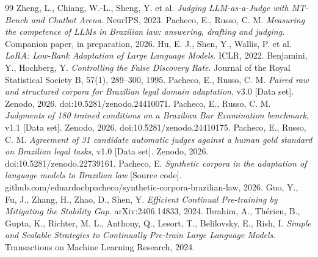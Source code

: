 \documentclass{IOS-Book-Article}
\begin{document}
\begin{thebibliography}{99}
 Zheng, L., Chiang, W.-L., Sheng, Y. et al. \emph{Judging LLM-as-a-Judge with MT-Bench and Chatbot Arena}. NeurIPS, 2023.
 Pacheco, E., Russo, C. M. \emph{Measuring the competence of LLMs in Brazilian law: answering, drafting and judging}. Companion paper, in preparation, 2026.
 Hu, E. J., Shen, Y., Wallis, P. et al. \emph{LoRA: Low-Rank Adaptation of Large Language Models}. ICLR, 2022.
 Benjamini, Y., Hochberg, Y. \emph{Controlling the False Discovery Rate}. Journal of the Royal Statistical Society B, 57(1), 289--300, 1995.
 Pacheco, E., Russo, C. M. \emph{Paired raw and structured corpora for Brazilian legal domain adaptation}, v3.0 [Data set]. Zenodo, 2026. doi:10.5281/zenodo.24410071.
 Pacheco, E., Russo, C. M. \emph{Judgments of 180 trained conditions on a Brazilian Bar Examination benchmark}, v1.1 [Data set]. Zenodo, 2026. doi:10.5281/zenodo.24410175.
 Pacheco, E., Russo, C. M. \emph{Agreement of 31 candidate automatic judges against a human gold standard on Brazilian legal tasks}, v1.0 [Data set]. Zenodo, 2026. doi:10.5281/zenodo.22739161.
 Pacheco, E. \emph{Synthetic corpora in the adaptation of language models to Brazilian law} [Source code]. github.com/eduardocbpacheco/synthetic-corpora-brazilian-law, 2026.
 Guo, Y., Fu, J., Zhang, H., Zhao, D., Shen, Y. \emph{Efficient Continual Pre-training by Mitigating the Stability Gap}. arXiv:2406.14833, 2024.
 Ibrahim, A., Thérien, B., Gupta, K., Richter, M. L., Anthony, Q., Lesort, T., Belilovsky, E., Rish, I. \emph{Simple and Scalable Strategies to Continually Pre-train Large Language Models}. Transactions on Machine Learning Research, 2024.
\end{thebibliography}
\end{document}
